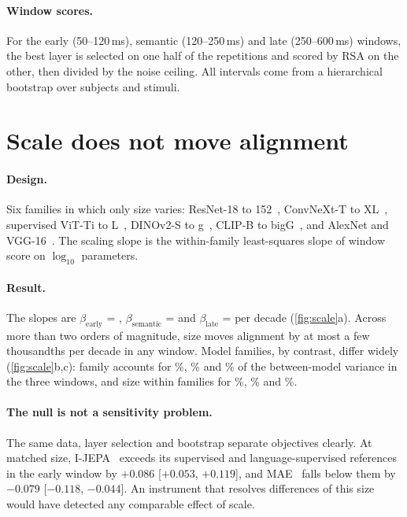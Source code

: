 \documentclass[10pt]{article}
\theoremstyle{plain}
\theoremstyle{definition}
\theoremstyle{remark}
\begin{document}
\paragraph{Window scores.} For the early (50--120\,ms), semantic (120--250\,ms) and late
(250--600\,ms) windows, the best layer is selected on one half of the repetitions and scored
by RSA on the other, then divided by the noise ceiling. All intervals come from a hierarchical
bootstrap over subjects and stimuli.

\section{Scale does not move alignment}
\label{sec:scale}

\paragraph{Design.} Six families in which only size varies: ResNet-18 to 152~\citep{he2016resnet},
ConvNeXt-T to XL~\citep{liu2022convnext}, supervised ViT-Ti to
L~\citep{dosovitskiy2021vit,steiner2022augreg}, DINOv2-S to g~\citep{oquab2024dinov2},
CLIP-B to bigG~\citep{radford2021clip,cherti2023openclip}, and AlexNet and
VGG-16~\citep{krizhevsky2012alexnet,simonyan2015vgg}. The scaling slope is the within-family
least-squares slope of window score on $\log_{10}$ parameters.

\paragraph{Result.} The slopes are $\beta_{\text{early}}$ = \vSlopeEarly,
$\beta_{\text{semantic}}$ = \vSlopeMid{} and $\beta_{\text{late}}$ = \vSlopeLate{} per decade
(\cref{fig:scale}a). Across more than two orders of magnitude, size moves alignment by at most a
few thousandths per decade in any window. Model families, by contrast, differ widely
(\cref{fig:scale}b,c): family accounts for \vVarFamEarly\%, \vVarFamMid\% and \vVarFamLate\%
of the between-model variance in the three windows, and size within families for
\vVarSizeEarly\%, \vVarSizeMid\% and \vVarSizeLate\%.

\paragraph{The null is not a sensitivity problem.} The same data, layer selection and bootstrap
separate objectives clearly. At matched size, I-JEPA~\citep{assran2023ijepa} exceeds its
supervised and language-supervised references in the early window by $+0.086$ [$+0.053$,
$+0.119$], and MAE~\citep{he2022mae} falls below them by $-0.079$ [$-0.118$, $-0.044$]. An
instrument that resolves differences of this size would have detected any comparable effect of
scale.
\end{document}
